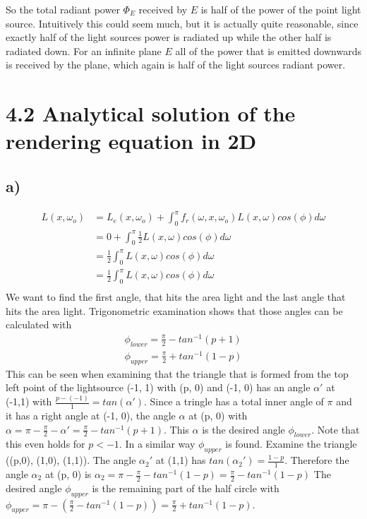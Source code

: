 \documentclass[a4paper]{scrartcl}
\begin{document}
So the total radiant power $\Phi_E$ received by $E$ is half of the power of the point light source. Intuitively this could seem much, but it is actually quite reasonable, since exactly half of the light sources 
power is radiated up while the other half is radiated down. For an infinite plane $E$ all of the power that is emitted downwards is received by the plane, which again is half of the light sources radiant power. 


\section*{4.2 Analytical solution of the rendering equation in 2D}
  \subsection*{a)}
    \begin{align*}
      L(x,\omega_o)
      &=L_e(x,\omega_o) + \int_{0}^\pi f_r(\omega, x, \omega_o) L(x,\omega)cos(\phi)d\omega\\
      &=0 + \int_{0}^\pi \frac{1}{2} L(x,\omega)cos(\phi)d\omega\\
      &=\frac{1}{2}\int_{0}^\pi L(x,\omega)cos(\phi)d\omega\\
      &=\frac{1}{2}\int_{0}^\pi L(x,\omega)cos(\phi)d\omega\\
    \end{align*}
    We want to find  the first angle, that hits the area light and the last angle that hits the area light. Trigonometric examination shows that those angles can be calculated with 
    \begin{align*}
      \phi_{lower} = \frac{\pi}{2} - tan^{-1}(p + 1) \\
      \phi_{upper} = \frac{\pi}{2} + tan^{-1}(1-p)
    \end{align*}
    This can be seen when examining that the triangle that is formed from the top left point of the lightsource (-1, 1) with (p, 0) and (-1, 0) has an angle $\alpha'$ at (-1,1) with $\frac{p - (-1)}{1} = tan(\alpha')$. 
    Since a tringle has a total inner angle of $\pi$ and it has a right angle at (-1, 0), the angle $\alpha$ at (p, 0) with $\alpha = \pi - \frac{\pi}{2} - \alpha' = \frac{\pi}{2} - tan^{-1}(p+1)$. This $\alpha$ is the desired angle 
    $\phi_{lower}$. Note that this even holds for $p < -1$. In a similar way $\phi_{upper}$ is found. 
    Examine the triangle ((p,0), (1,0), (1,1)). The angle $\alpha_2'$ at (1,1) has $tan(\alpha_2') = \frac{1-p}{1}$. Therefore the angle $\alpha_2$  at (p, 0) is $\alpha_2 = \pi - \frac{\pi}{2} - tan^{-1}(1-p) = \frac{\pi}{2} - tan^{-1}(1-p)$
    The desired angle $\phi_{upper}$ is the remaining part of the half circle with $\phi_{upper} = \pi - (\frac{\pi}{2} - tan^{-1}(1-p)) = \frac{\pi}{2} + tan^{-1}(1-p)$.
\end{document}
